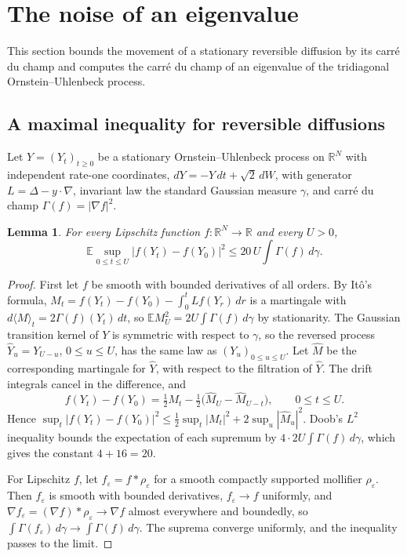 \documentclass[11pt]{amsart}
\newtheorem{lemma}[theorem]{Lemma}
\theoremstyle{remark}
\newcommand{\EE}{\mathbb{E}}
\newcommand{\RR}{\mathbb{R}}
\begin{document}
\section{The noise of an eigenvalue}\label{sec:maximal}

This section bounds the movement of a stationary reversible diffusion by its carr\'e du champ and computes the carr\'e
du champ of an eigenvalue of the tridiagonal Ornstein--Uhlenbeck process.

\subsection{A maximal inequality for reversible diffusions}

Let $Y=(Y_t)_{t\ge0}$ be a stationary Ornstein--Uhlenbeck process on $\RR^N$ with independent rate-one coordinates,
$dY=-Y\,dt+\sqrt2\,dW$, with generator $L=\Delta-y\cdot\nabla$, invariant law the standard Gaussian measure $\gamma$,
and carr\'e du champ $\Gamma(f)=|\nabla f|^2$.

\begin{lemma}\label{lem:maximal}
For every Lipschitz function $f:\RR^N\to\RR$ and every $U>0$,
\[
\EE\sup_{0\le t\le U}\bigl|f(Y_t)-f(Y_0)\bigr|^2\le 20\,U\int\Gamma(f)\,d\gamma .
\]
\end{lemma}

\begin{proof}
First let $f$ be smooth with bounded derivatives of all orders. By It\^o's formula,
$M_t=f(Y_t)-f(Y_0)-\int_0^tLf(Y_r)\,dr$ is a martingale with $d\langle M\rangle_t=2\Gamma(f)(Y_t)\,dt$, so
$\EE M_U^2=2U\int\Gamma(f)\,d\gamma$ by stationarity. The Gaussian transition kernel of $Y$ is symmetric with respect to
$\gamma$, so the reversed process $\widehat Y_u=Y_{U-u}$, $0\le u\le U$, has the same law as $(Y_u)_{0\le u\le U}$. Let
$\widehat M$ be the corresponding martingale for $\widehat Y$, with respect to the filtration of $\widehat Y$. The drift
integrals cancel in the difference, and
\[
f(Y_t)-f(Y_0)=\tfrac12M_t-\tfrac12\bigl(\widehat M_U-\widehat M_{U-t}\bigr),\qquad 0\le t\le U.
\]
Hence $\sup_t|f(Y_t)-f(Y_0)|^2\le\frac12\sup_t|M_t|^2+2\sup_u|\widehat M_u|^2$. Doob's $L^2$ inequality bounds the
expectation of each supremum by $4\cdot 2U\int\Gamma(f)\,d\gamma$, which gives the constant $4+16=20$.

For Lipschitz $f$, let $f_\varepsilon=f*\rho_\varepsilon$ for a smooth compactly supported mollifier $\rho_\varepsilon$.
Then $f_\varepsilon$ is smooth with bounded derivatives, $f_\varepsilon\to f$ uniformly, and
$\nabla f_\varepsilon=(\nabla f)*\rho_\varepsilon\to\nabla f$ almost everywhere and boundedly, so
$\int\Gamma(f_\varepsilon)\,d\gamma\to\int\Gamma(f)\,d\gamma$. The suprema converge uniformly, and the inequality
passes to the limit.
\end{proof}
\end{document}
